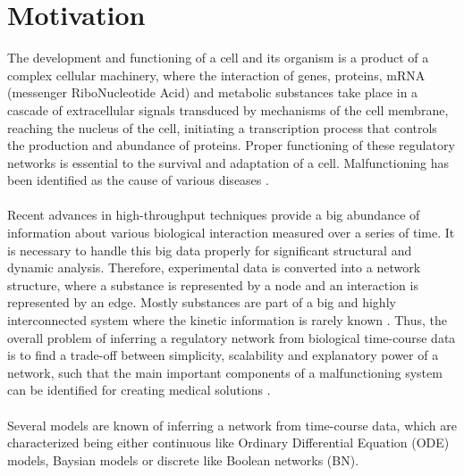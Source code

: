 \section{Motivation}
The development and functioning of a cell and its organism is a product of a complex cellular machinery, where the interaction of genes, proteins, \gls{mRNA} (messenger RiboNucleotide Acid) and metabolic substances take place in a cascade of extracellular signals transduced by mechanisms of the cell membrane, reaching the nucleus of the cell, initiating a transcription process that controls the production and abundance of proteins. Proper functioning of these regulatory networks is essential to the survival and adaptation of a cell. Malfunctioning has been identified as the cause of various diseases \citep{Berestovsky.2013}.
\\\\
Recent advances in high-throughput techniques provide a big abundance of information about various biological interaction measured over a series of time. It is necessary to handle this big data properly for significant structural and dynamic analysis. Therefore, experimental data is converted into a network structure, where a substance is represented by a node and an interaction is represented by an edge. Mostly substances are part of a big and highly interconnected system where the kinetic information is rarely known \citep{Saadatpour.2013}. Thus, the overall problem of inferring a regulatory network from biological time-course data is to find a trade-off between simplicity, scalability and explanatory power of a network, such that the main important components of a malfunctioning system can be identified for creating medical solutions \citep{Berestovsky.2013} \citep{Barman.2017}.
\\\\
Several models are known of inferring a network from time-course data, which are characterized being either continuous like Ordinary Differential Equation (ODE) models, Baysian models or discrete like Boolean networks (BN)\citep{Saadatpour.2013}. 

